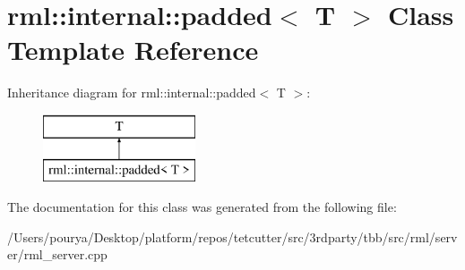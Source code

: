 \hypertarget{classrml_1_1internal_1_1padded}{}\section{rml\+:\+:internal\+:\+:padded$<$ T $>$ Class Template Reference}
\label{classrml_1_1internal_1_1padded}
Inheritance diagram for rml\+:\+:internal\+:\+:padded$<$ T $>$\+:\begin{figure}[H]
\begin{center}
\leavevmode
\includegraphics[height=2.000000cm]{classrml_1_1internal_1_1padded}
\end{center}
\end{figure}


The documentation for this class was generated from the following file\+:\begin{DoxyCompactItemize}
\item 
/\+Users/pourya/\+Desktop/platform/repos/tetcutter/src/3rdparty/tbb/src/rml/server/rml\+\_\+server.\+cpp\end{DoxyCompactItemize}
